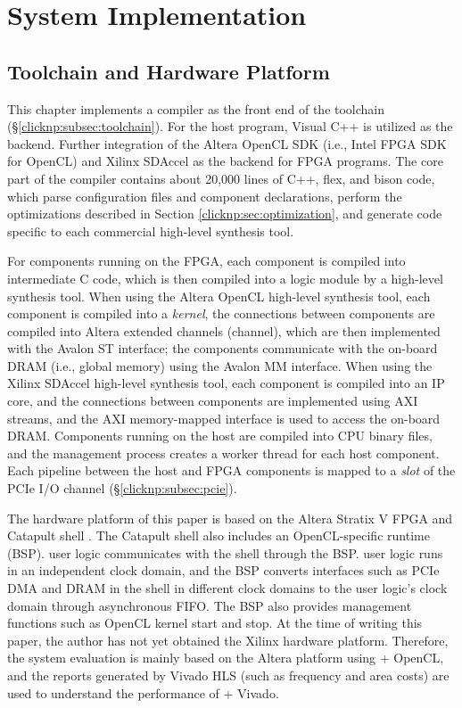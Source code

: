 \section{System Implementation}
\label{clicknp:sec:impl}

\subsection{\name Toolchain and Hardware Platform}

This chapter implements a \name compiler as the front end of the \name toolchain (\S \ref {clicknp:subsec:toolchain}).
For the host program, Visual C++ is utilized as the backend. Further integration of the Altera OpenCL SDK (i.e., Intel FPGA SDK for OpenCL) \cite {aoc} and Xilinx SDAccel \cite {vivado} as the backend for FPGA programs.
The core part of the \name compiler contains about 20,000 lines of C++, flex, and bison code, which parse configuration files and component declarations, perform the optimizations described in Section \ref {clicknp:sec:optimization}, and generate code specific to each commercial high-level synthesis tool.

For components running on the FPGA, each component is compiled into intermediate C code, which is then compiled into a logic module by a high-level synthesis tool.
When using the Altera OpenCL high-level synthesis tool, each \name component is compiled into a \textit {kernel}, the connections between components are compiled into Altera extended channels (channel), which are then implemented with the Avalon ST interface; the components communicate with the on-board DRAM (i.e., global memory) using the Avalon MM interface.
When using the Xilinx SDAccel high-level synthesis tool, each component is compiled into an IP core, and the connections between components are implemented using AXI streams, and the AXI memory-mapped interface is used to access the on-board DRAM.
Components running on the host are compiled into CPU binary files, and the management process creates a worker thread for each host component.
Each pipeline between the host and FPGA components is mapped to a \textit {slot} of the PCIe I/O channel (\S \ref {clicknp:subsec:pcie}).

The hardware platform of this paper is based on the Altera Stratix V FPGA and Catapult shell \cite {putnam2014reconfigurable}.
The Catapult shell also includes an OpenCL-specific runtime (BSP). \name user logic communicates with the shell through the BSP.
\name user logic runs in an independent clock domain, and the BSP converts interfaces such as PCIe DMA and DRAM in the shell in different clock domains to the user logic's clock domain through asynchronous FIFO.
The BSP also provides management functions such as OpenCL kernel start and stop.
At the time of writing this paper, the author has not yet obtained the Xilinx hardware platform.
Therefore, the system evaluation is mainly based on the Altera platform using \name + OpenCL, and the reports generated by Vivado HLS (such as frequency and area costs) are used to understand the performance of \name + Vivado.


